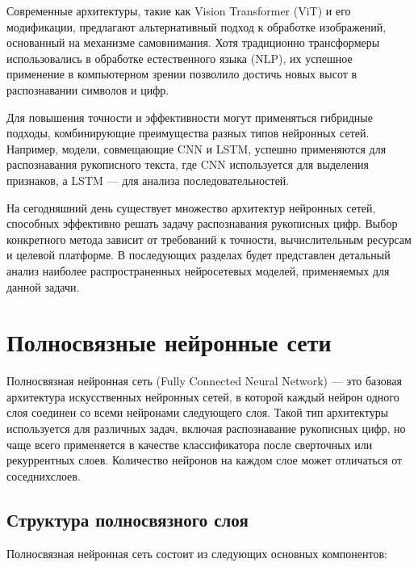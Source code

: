 Современные архитектуры, такие как Vision Transformer (ViT) и его модификации, 
предлагают альтернативный подход к обработке изображений, основанный на 
механизме самовнимания. Хотя традиционно трансформеры использовались в 
обработке естественного языка (NLP), их успешное применение в компьютерном 
зрении позволило достичь новых высот в распознавании символов и цифр.

Для повышения точности и эффективности могут применяться гибридные подходы, 
комбинирующие преимущества разных типов нейронных сетей. Например, модели, 
совмещающие CNN и LSTM, успешно применяются для распознавания рукописного 
текста, где CNN используется для выделения признаков, а LSTM — для анализа 
последовательностей.

На сегодняшний день существует множество архитектур нейронных сетей, способных 
эффективно решать задачу распознавания рукописных цифр. Выбор конкретного 
метода зависит от требований к точности, вычислительным ресурсам и целевой 
платформе. В последующих разделах будет представлен детальный анализ наиболее 
распространенных нейросетевых моделей, применяемых для данной задачи.

\section{Полносвязные нейронные сети}\par
\hspace*{12.5 mm}Полносвязная нейронная сеть (Fully Connected Neural Network) — 
это базовая архитектура искусственных нейронных сетей, в которой каждый нейрон 
одного слоя соединен со всеми нейронами следующего слоя. Такой тип архитектуры 
используется для различных задач, включая распознавание рукописных цифр, но 
чаще всего применяется в качестве классификатора после сверточных или 
рекуррентных слоев. Количество нейронов на каждом слое может отличаться от 
соседнихслоев.

\subsection{Структура полносвязного слоя}\par
\hspace*{12.5 mm}Полносвязная нейронная сеть состоит из следующих основных 
компонентов:

